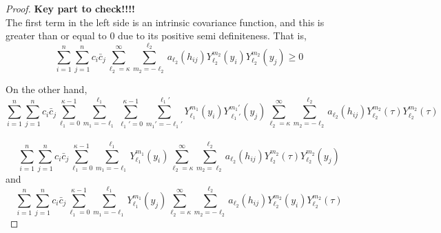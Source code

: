 \documentclass[11pt]{article}
\begin{document}
\begin{itemize}
\begin{proof}
\textbf{{\color{red} Key part to check!!!!}}\\
The first term in the left side is an intrinsic covariance function, and this is greater than or equal to 0 due to its positive semi definiteness. That is,\\
$$\sum_{i=1}^n \sum_{j=1}^n c_i \bar{c}_j \sum_{\ell_2=\kappa}^{\infty} \sum_{m_2=-\ell_2}^{\ell_2}  a_{\ell_2}(h_{ij}) Y_{\ell_2}^{m_2}(y_i) Y_{\ell_2}^{m_2}(y_j) \ge 0$$

On the other hand,\\
$$\sum_{i=1}^n \sum_{j=1}^n c_i \bar{c}_j \sum_{\ell_1=0}^{\kappa-1} \sum_{m_1=-\ell_1}^{\ell_1} \sum_{\ell_1'=0}^{\kappa-1} \sum_{m_1'=-\ell_1'}^{\ell_1'} Y_{\ell_1}^{m_1}(y_i) Y_{\ell_1'}^{m_1'}(y_j) \sum_{\ell_2=\kappa}^{\infty} \sum_{m_2=-\ell_2}^{\ell_2} a_{\ell_2}(h_{ij}) Y_{\ell_2}^{m_2}(\tau) Y_{\ell_2}^{m_2}(\tau)$$
\\
$$\sum_{i=1}^n \sum_{j=1}^n c_i \bar{c}_j \sum_{\ell_1=0}^{\kappa-1} \sum_{m_1=-\ell_1}^{\ell_1} Y_{\ell_1}^{m_1}(y_i) \sum_{\ell_2=\kappa}^{\infty} \sum_{m_2=\ell_2}^{\ell_2}  a_{\ell_2}(h_{ij}) Y_{\ell_2}^{m_2}(\tau) Y_{\ell_2}^{m_2}(y_j)$$
and\\
$$\sum_{i=1}^n \sum_{j=1}^n c_i \bar{c}_j \sum_{\ell_1=0}^{\kappa-1} \sum_{m_1=-\ell_1}^{\ell_1} Y_{\ell_1}^{m_1}(y_j) \sum_{\ell_2=\kappa}^{\infty} \sum_{m_2=-\ell_2}^{\ell_2}  a_{\ell_2}(h_{ij}) Y_{\ell_2}^{m_2}(y_i) Y_{\ell_2}^{m_2}(\tau)$$


\end{proof}
\end{itemize}
\end{document}
